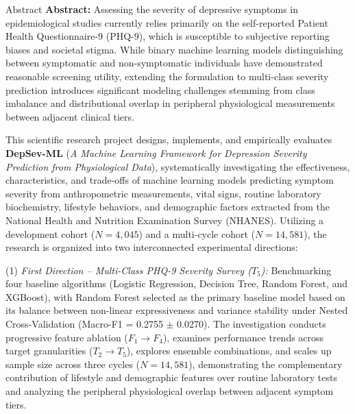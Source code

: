 \documentclass{uetgraduation}
\begin{document}
\begin{preamble}{Abstract}
\textbf{Abstract:} Assessing the severity of depressive symptoms in epidemiological studies currently relies primarily on the self-reported Patient Health Questionnaire-9 (PHQ-9), which is susceptible to subjective reporting biases and societal stigma. While binary machine learning models distinguishing between symptomatic and non-symptomatic individuals have demonstrated reasonable screening utility, extending the formulation to multi-class severity prediction introduces significant modeling challenges stemming from class imbalance and distributional overlap in peripheral physiological measurements between adjacent clinical tiers.

This scientific research project designs, implements, and empirically evaluates \textbf{DepSev-ML} (\textit{A Machine Learning Framework for Depression Severity Prediction from Physiological Data}), systematically investigating the effectiveness, characteristics, and trade-offs of machine learning models predicting symptom severity from anthropometric measurements, vital signs, routine laboratory biochemistry, lifestyle behaviors, and demographic factors extracted from the National Health and Nutrition Examination Survey (NHANES). Utilizing a development cohort ($N = 4,045$) and a multi-cycle cohort ($N = 14,581$), the research is organized into two interconnected experimental directions:

(1) \textit{First Direction -- Multi-Class PHQ-9 Severity Survey ($T_5$):} Benchmarking four baseline algorithms (Logistic Regression, Decision Tree, Random Forest, and XGBoost), with Random Forest selected as the primary baseline model based on its balance between non-linear expressiveness and variance stability under Nested Cross-Validation (Macro-F1 = 0.2755 $\pm$ 0.0270). The investigation conducts progressive feature ablation ($F_1 \to F_4$), examines performance trends across target granularities ($T_2 \to T_5$), explores ensemble combinations, and scales up sample size across three cycles ($N = 14,581$), demonstrating the complementary contribution of lifestyle and demographic features over routine laboratory tests and analyzing the peripheral physiological overlap between adjacent symptom tiers.


\end{preamble}
\end{document}

